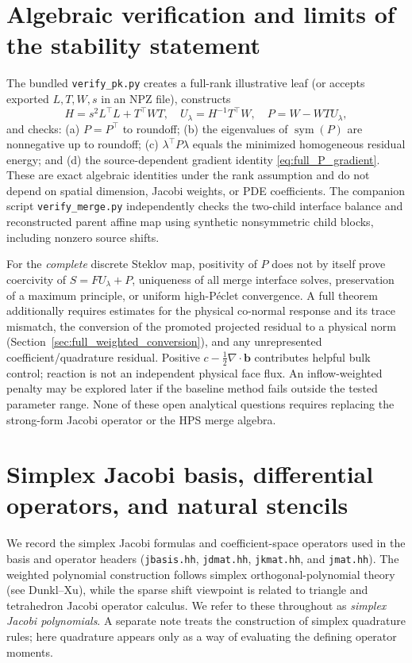 \documentclass[11pt]{article}
\begin{document}
\section{Algebraic verification and limits of the stability statement}
The bundled \texttt{verify\_pk.py} creates a full-rank illustrative
leaf (or accepts exported $L,T,W,s$ in an NPZ file), constructs
\begin{equation}\label{eq:full_verify_def}
 H=s^2L^\top L+T^\top WT,\quad
 U_\lambda=H^{-1}T^\top W,\quad
 P=W-WTU_\lambda,
\end{equation}
and checks: (a) $P=P^\top$ to roundoff; (b) the eigenvalues of
$\operatorname{sym}(P)$ are nonnegative up to roundoff;
(c) $\lambda^\top P\lambda$ equals the minimized homogeneous
residual energy; and (d) the source-dependent gradient identity
\eqref{eq:full_P_gradient}.  These are exact algebraic identities
under the rank assumption and do not depend on spatial dimension,
Jacobi weights, or PDE coefficients.  The companion script
\texttt{verify\_merge.py} independently checks the two-child
interface balance and reconstructed parent affine map using
synthetic nonsymmetric child blocks, including nonzero source shifts.

For the \emph{complete} discrete Steklov map, positivity of $P$ does
not by itself prove coercivity of $S=FU_\lambda+P$, uniqueness of
all merge interface solves, preservation of a maximum principle, or
uniform high-P\'eclet convergence.  A full theorem additionally
requires estimates for the physical co-normal response and its
trace mismatch, the conversion of the promoted projected residual
to a physical norm (Section~\ref{sec:full_weighted_conversion}),
and any unrepresented coefficient/quadrature residual.  Positive
$c-\frac12\nabla\cdot\bm b$ contributes helpful bulk control;
reaction is not an independent physical face flux.  An inflow-weighted
penalty may be explored later if the baseline method fails outside
the tested parameter range.  None of these open analytical questions
requires replacing the strong-form Jacobi operator or the HPS merge
algebra.

\clearpage
\section{Simplex Jacobi basis, differential operators, and natural stencils}
\label{sec:full_jacobi_ops}

We record the simplex Jacobi formulas and coefficient-space operators
used in the basis and operator headers (\texttt{jbasis.hh},
\texttt{jdmat.hh}, \texttt{jkmat.hh}, and \texttt{jmat.hh}).  The weighted
polynomial construction follows simplex orthogonal-polynomial theory
(see Dunkl--Xu), while
the sparse shift viewpoint is related to triangle and tetrahedron Jacobi
operator calculus.  We refer to these throughout as \emph{simplex Jacobi polynomials}.  A separate note treats the
construction of simplex quadrature rules; here quadrature appears only
as a way of evaluating the defining operator moments.
\end{document}
